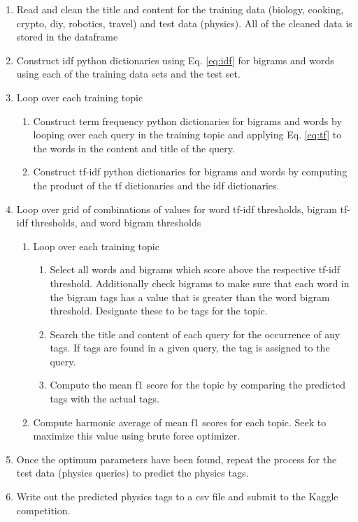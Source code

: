 \documentclass{article}
\begin{document}
\begin{enumerate}
 \item Read and clean the title and content for the training data (biology,
   cooking, crypto, diy, robotics, travel) and test data (physics). All of the
   cleaned data is stored in the dataframe
 \item Construct idf python dictionaries using Eq. \ref{eq:idf} for bigrams and
   words using each of the training data sets and the test set.
  \item Loop over each training topic
  \begin{enumerate}
   \item Construct term frequency python dictionaries for bigrams and words by
     looping over each query in the training topic and applying
     Eq. \ref{eq:tf} to the words in the content and title of the query.
   \item Construct tf-idf python dictionaries for bigrams and words by
     computing the product of the tf dictionaries and the idf dictionaries.
  \end{enumerate}
 \item Loop over grid of combinations of values for word tf-idf thresholds,
   bigram tf-idf thresholds, and word bigram thresholds
 \begin{enumerate}
  \item Loop over each training topic
  \begin{enumerate}
   \item Select all words and bigrams which score above the respective
    tf-idf threshold. Additionally check bigrams to make sure that each word
    in the bigram tags has a value that is greater than the word bigram
    threshold. Designate these to be tags for the topic.
   \item Search the title and content of each query for the occurrence of any
    tags. If tags are found in a given query, the tag is assigned to the
    query.
   \item Compute the mean f1 score for the topic by comparing the predicted
    tags with the actual tags.
  \end{enumerate}
  \item Compute harmonic average of mean f1 scores for each topic. Seek to
   maximize this value using brute force optimizer.
 \end{enumerate}
 \item Once the optimum parameters have been found, repeat the process for the
   test data (physics queries) to predict the physics tags.
 \item Write out the predicted physics tags to a csv file and submit to the
   Kaggle competition.
\end{enumerate}
\end{document}
